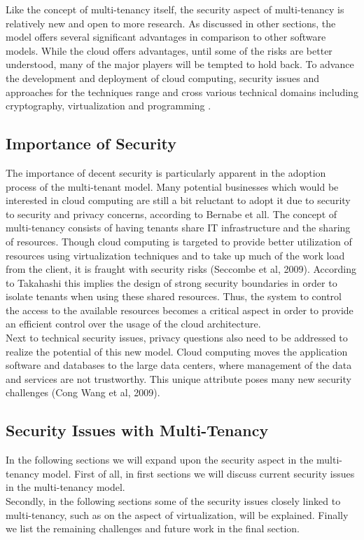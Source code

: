 Like the concept of multi-tenancy itself, the security aspect of multi-tenancy is relatively new and open to more research. As discussed in other sections, the model offers several significant advantages in comparison to other software models. While the cloud offers advantages, until some of the risks are better understood, many of the major players will be tempted to hold back. To advance the development and deployment of cloud computing, security issues and approaches for the techniques range and cross various technical domains including cryptography, virtualization and programming \cite{Takahashi2012Security}.

\subsection{Importance of Security}
The importance of decent security is particularly apparent in the adoption process of the multi-tenant model. Many potential businesses which would be interested in cloud computing are still a bit reluctant to adopt it due to security to security and privacy concerns, according to Bernabe et all\cite{Bernabe2012Auth}. The concept of multi-tenancy consists of having tenants share IT infrastructure and the sharing of resources. Though cloud computing is targeted to provide better utilization of resources using virtualization techniques and to take up much of the work load from the client, it is fraught with security risks (Seccombe et al, 2009). According to Takahashi\cite{Takahashi2012Security} this implies the design of strong security boundaries in order to isolate tenants when using these shared resources. Thus, the system to control the access to the available resources becomes a critical aspect in order to provide an efficient control over the usage of the cloud architecture. \\
Next to technical security issues, privacy questions also need to be addressed to realize the potential of this new model. Cloud computing moves the application software and databases to the large data centers, where management of the data and services are not trustworthy. This unique attribute poses many new security challenges (Cong Wang et al, 2009). 

\subsection{Security Issues with Multi-Tenancy}
In the following sections we will expand upon the security aspect in the multi-tenancy model. First of all, in first sections we will discuss current security issues in the multi-tenancy model. \\
Secondly, in the following sections some of the security issues closely linked to multi-tenancy, such as on the aspect of virtualization, will be explained. Finally we list the remaining challenges and future work in the final section.

